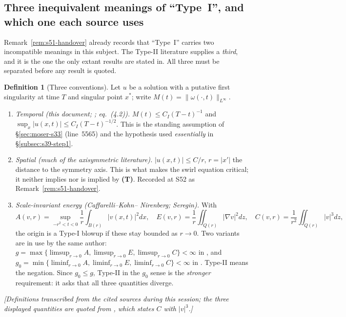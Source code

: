 \documentclass[11pt]{article}
\theoremstyle{definition}
\newtheorem{definition}[theorem]{Definition}
\theoremstyle{remark}
\begin{document}
\subsection{Three inequivalent meanings of ``Type~I'', and which one each
source uses}
\label{subsec:wpt1-conventions}

Remark~\ref{rem:s51-handover} already records that ``Type~I'' carries two
incompatible meanings in this subject. The Type-II literature supplies a
\emph{third}, and it is the one the only extant results are stated in. All
three must be separated before any result is quoted.

\begin{definition}[Three conventions]\label{def:wpt1-conventions}
  Let $u$ be a solution with a putative first singularity at time $T$ and
  singular point $x^*$; write $M(t)=\|\omega(\cdot,t)\|_{L^\infty}$.
  \begin{enumerate}[label=\textbf{(\Alph*)},leftmargin=2.6em]
    \item[\textbf{(T)}] \emph{Temporal (this document; \cite{KNSS2009};
      \cite{BarkerPrange2023} eq.~(4.2)).}
      $M(t)\leq C_I(T-t)^{-1}$ and $\sup_x|u(x,t)|\leq C_I(T-t)^{-1/2}$.
      This is the standing assumption of \S\ref{sec:moser-s33} (line~5565)
      and the hypothesis used \emph{essentially} in
      \S\ref{subsec:s39-step1}.
    \item[\textbf{(S)}] \emph{Spatial (much of the axisymmetric literature).}
      $|u(x,t)|\leq C/r$, $r=|x'|$ the distance to the symmetry axis. This is
      what makes the swirl equation critical; it neither implies nor is
      implied by \textbf{(T)}. Recorded at S52 as
      Remark~\ref{rem:s51-handover}.
    \item[\textbf{(E)}] \emph{Scale-invariant energy (Caffarelli--Kohn--%
      Nirenberg; Seregin).} With
      \[
        A(v,r)=\sup_{-r^2<t<0}\frac1r\int_{B(r)}|v(x,t)|^2dx,\quad
        E(v,r)=\frac1r\iint_{Q(r)}|\nabla v|^2dz,\quad
        C(v,r)=\frac1{r^2}\iint_{Q(r)}|v|^3dz,
      \]
      the origin is a Type-I blowup if these stay bounded as $r\to0$. Two
      variants are in use by the same author: $g=\max\{\limsup_{r\to0}A,
      \limsup_{r\to0}E,\limsup_{r\to0}C\}<\infty$
      in \cite{Seregin2024TypeII}, and
      $g_0=\min\{\liminf_{r\to0}A,\liminf_{r\to0}E,\liminf_{r\to0}C\}<\infty$
      in \cite{Seregin2026Potential}. Type-II means the negation.
      Since $g_0\leq g$, Type-II in the $g_0$ sense is the \emph{stronger}
      requirement: it asks that all three quantities diverge.
  \end{enumerate}
  \emph{[Definitions transcribed from the cited sources during this session;
  the three displayed quantities are quoted from
  \cite{Seregin2026Potential}, which states $C$ with $|v|^3$.]}
\end{definition}
\end{document}
